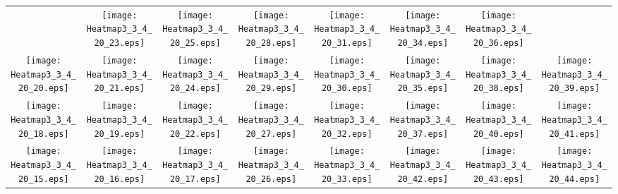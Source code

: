 \documentclass{standalone}
\begin{document}
\renewcommand{\arraystretch}{0}
\setlength{\tabcolsep}{0pt}
\begin{tabular}{ *8{c} }
 & \texttt{[image: Heatmap3\_3\_4\_20\_23.eps]} & \texttt{[image: Heatmap3\_3\_4\_20\_25.eps]} & \texttt{[image: Heatmap3\_3\_4\_20\_28.eps]} & \texttt{[image: Heatmap3\_3\_4\_20\_31.eps]} & \texttt{[image: Heatmap3\_3\_4\_20\_34.eps]} & \texttt{[image: Heatmap3\_3\_4\_20\_36.eps]} &  \\
\texttt{[image: Heatmap3\_3\_4\_20\_20.eps]} & \texttt{[image: Heatmap3\_3\_4\_20\_21.eps]} & \texttt{[image: Heatmap3\_3\_4\_20\_24.eps]} & \texttt{[image: Heatmap3\_3\_4\_20\_29.eps]} & \texttt{[image: Heatmap3\_3\_4\_20\_30.eps]} & \texttt{[image: Heatmap3\_3\_4\_20\_35.eps]} & \texttt{[image: Heatmap3\_3\_4\_20\_38.eps]} & \texttt{[image: Heatmap3\_3\_4\_20\_39.eps]} \\
\texttt{[image: Heatmap3\_3\_4\_20\_18.eps]} & \texttt{[image: Heatmap3\_3\_4\_20\_19.eps]} & \texttt{[image: Heatmap3\_3\_4\_20\_22.eps]} & \texttt{[image: Heatmap3\_3\_4\_20\_27.eps]} & \texttt{[image: Heatmap3\_3\_4\_20\_32.eps]} & \texttt{[image: Heatmap3\_3\_4\_20\_37.eps]} & \texttt{[image: Heatmap3\_3\_4\_20\_40.eps]} & \texttt{[image: Heatmap3\_3\_4\_20\_41.eps]} \\
\texttt{[image: Heatmap3\_3\_4\_20\_15.eps]} & \texttt{[image: Heatmap3\_3\_4\_20\_16.eps]} & \texttt{[image: Heatmap3\_3\_4\_20\_17.eps]} & \texttt{[image: Heatmap3\_3\_4\_20\_26.eps]} & \texttt{[image: Heatmap3\_3\_4\_20\_33.eps]} & \texttt{[image: Heatmap3\_3\_4\_20\_42.eps]} & \texttt{[image: Heatmap3\_3\_4\_20\_43.eps]} & \texttt{[image: Heatmap3\_3\_4\_20\_44.eps]} \\

\end{tabular}
\end{document}

